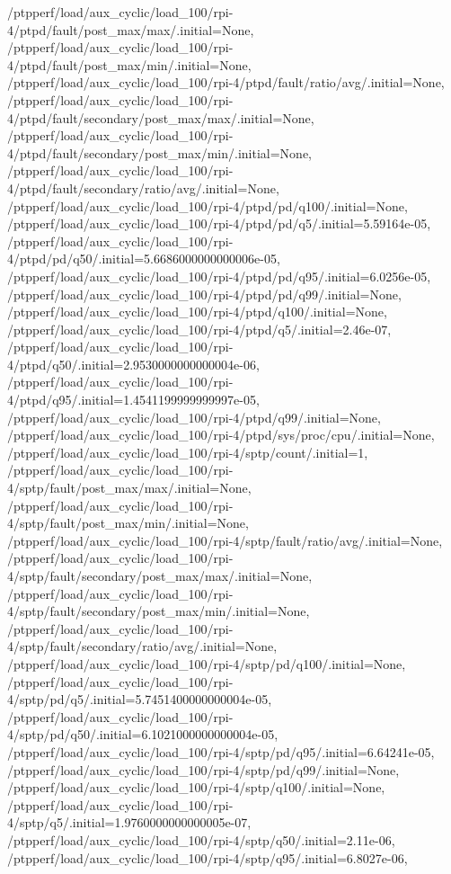 {    /ptpperf/load/aux_cyclic/load_100/rpi-4/ptpd/fault/post_max/max/.initial=None,
    /ptpperf/load/aux_cyclic/load_100/rpi-4/ptpd/fault/post_max/min/.initial=None,
    /ptpperf/load/aux_cyclic/load_100/rpi-4/ptpd/fault/ratio/avg/.initial=None,
    /ptpperf/load/aux_cyclic/load_100/rpi-4/ptpd/fault/secondary/post_max/max/.initial=None,
    /ptpperf/load/aux_cyclic/load_100/rpi-4/ptpd/fault/secondary/post_max/min/.initial=None,
    /ptpperf/load/aux_cyclic/load_100/rpi-4/ptpd/fault/secondary/ratio/avg/.initial=None,
    /ptpperf/load/aux_cyclic/load_100/rpi-4/ptpd/pd/q100/.initial=None,
    /ptpperf/load/aux_cyclic/load_100/rpi-4/ptpd/pd/q5/.initial=5.59164e-05,
    /ptpperf/load/aux_cyclic/load_100/rpi-4/ptpd/pd/q50/.initial=5.6686000000000006e-05,
    /ptpperf/load/aux_cyclic/load_100/rpi-4/ptpd/pd/q95/.initial=6.0256e-05,
    /ptpperf/load/aux_cyclic/load_100/rpi-4/ptpd/pd/q99/.initial=None,
    /ptpperf/load/aux_cyclic/load_100/rpi-4/ptpd/q100/.initial=None,
    /ptpperf/load/aux_cyclic/load_100/rpi-4/ptpd/q5/.initial=2.46e-07,
    /ptpperf/load/aux_cyclic/load_100/rpi-4/ptpd/q50/.initial=2.9530000000000004e-06,
    /ptpperf/load/aux_cyclic/load_100/rpi-4/ptpd/q95/.initial=1.4541199999999997e-05,
    /ptpperf/load/aux_cyclic/load_100/rpi-4/ptpd/q99/.initial=None,
    /ptpperf/load/aux_cyclic/load_100/rpi-4/ptpd/sys/proc/cpu/.initial=None,
    /ptpperf/load/aux_cyclic/load_100/rpi-4/sptp/count/.initial=1,
    /ptpperf/load/aux_cyclic/load_100/rpi-4/sptp/fault/post_max/max/.initial=None,
    /ptpperf/load/aux_cyclic/load_100/rpi-4/sptp/fault/post_max/min/.initial=None,
    /ptpperf/load/aux_cyclic/load_100/rpi-4/sptp/fault/ratio/avg/.initial=None,
    /ptpperf/load/aux_cyclic/load_100/rpi-4/sptp/fault/secondary/post_max/max/.initial=None,
    /ptpperf/load/aux_cyclic/load_100/rpi-4/sptp/fault/secondary/post_max/min/.initial=None,
    /ptpperf/load/aux_cyclic/load_100/rpi-4/sptp/fault/secondary/ratio/avg/.initial=None,
    /ptpperf/load/aux_cyclic/load_100/rpi-4/sptp/pd/q100/.initial=None,
    /ptpperf/load/aux_cyclic/load_100/rpi-4/sptp/pd/q5/.initial=5.7451400000000004e-05,
    /ptpperf/load/aux_cyclic/load_100/rpi-4/sptp/pd/q50/.initial=6.1021000000000004e-05,
    /ptpperf/load/aux_cyclic/load_100/rpi-4/sptp/pd/q95/.initial=6.64241e-05,
    /ptpperf/load/aux_cyclic/load_100/rpi-4/sptp/pd/q99/.initial=None,
    /ptpperf/load/aux_cyclic/load_100/rpi-4/sptp/q100/.initial=None,
    /ptpperf/load/aux_cyclic/load_100/rpi-4/sptp/q5/.initial=1.9760000000000005e-07,
    /ptpperf/load/aux_cyclic/load_100/rpi-4/sptp/q50/.initial=2.11e-06,
    /ptpperf/load/aux_cyclic/load_100/rpi-4/sptp/q95/.initial=6.8027e-06,
}
